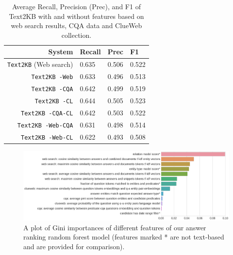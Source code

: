 \begin{table}[h]
\centering
\begin{tabular}{rlll}
System & Recall & Prec &  F1 \\
\hline
\texttt{Text2KB} (Web search) & 0.635 & 0.506 & 0.522 \\
\hline
\texttt{Text2KB -Web} & 0.633 & 0.496 & 0.513 \\
\texttt{Text2KB -CQA} & 0.642 & 0.499 & 0.519 \\
\texttt{Text2KB -CL} & 0.644 & 0.505 & 0.523 \\
\hline
\texttt{Text2KB -CQA-CL} & 0.642 & 0.503 & 0.522 \\
\texttt{Text2KB -Web-CQA} & 0.631 & 0.498 & 0.514 \\
\texttt{Text2KB -Web-CL} & 0.622 & 0.493 & 0.508 \\
\end{tabular}
\caption{Average Recall, Precision (Prec), and F1 of Text2KB with and without features based on web search results, CQA data and ClueWeb collection.}
\label{table:factoid:text2kb:ablation:features}
\end{table}

\begin{figure}
\centering
\includegraphics[width=\textwidth]{img/feature_importances}
\caption{A plot of Gini importances of different features of our answer ranking random forest model (features marked * are not text-based and are provided for comparison).}
\label{figure:factoid:text2kb:ablation:feature_importances}
\end{figure}

